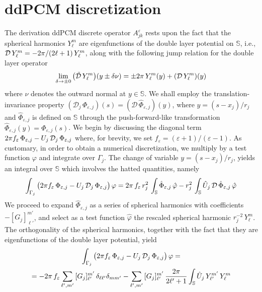 \section{ddPCM discretization\label{app:mats}}
The derivation ddPCM discrete operator $A^\varepsilon_{jk}$ rests upon the fact that the spherical harmonics $Y_\ell^m$ are eigenfunctions of the double layer potential on $\mathbb{S}$, i.e., $\mathcal{D} \, Y_\ell^m =  -2\pi/ (2\ell+1) \,  Y_\ell^m$, along with the following jump relation for the double layer operator
\begin{equation}\label{eq:jump}
	\lim_{\delta \to \pm 0} \big(\tilde{\mathcal{D}} \, Y_\ell^m\big)(y \pm \delta \nu) =  \pm 2\pi \, Y_\ell^m(y)+ ( \mathcal{D} \, Y_\ell^m )(y)
\end{equation}
where $\nu$ denotes the outward normal at $y \in \mathbb{S}$. We shall employ the translation-invariance property $(\mathcal{D}_j \, \Phi_{\varepsilon,j})(s) = (\mathcal{D} \, \hat{\Phi}_{\varepsilon,j})(y)$, where $y = (s - x_j)/r_j$ and $\hat{\Phi}_{\varepsilon,j}$ is defined on $\mathbb{S}$ through the push-forward-like transformation $\hat{\Phi}_{\varepsilon,j}(y) = \Phi_{\varepsilon,j}(s)$. We begin by discussing the diagonal term $2\pi f_\varepsilon \, \Phi_{\varepsilon,j} - U_j \, \mathcal{D}_j \, \Phi_{\varepsilon,j}$ where, for brevity, we set $f_\varepsilon = (\varepsilon + 1)/(\varepsilon - 1)$. As customary, in order to obtain a numerical discretization, we multiply by a test function $\varphi$ and integrate over $\Gamma_j$.  The change of variable $y = (s- x_j)/r_j$, yields an integral over $\mathbb{S}$ which involves the hatted quantities, namely
\[
\int_{\Gamma_j} \big(2\pi f_\varepsilon \, \Phi_{\varepsilon,j}  - U_j \, \mathcal{D}_j \, \Phi_{\varepsilon,j} \big) \, \varphi = 2 \pi  \, f_\varepsilon \, r_j^2 \,\int_\mathbb{S} \hat{\Phi}_{\varepsilon,j}  \, \hat{\varphi} - r_j^2 \, \int_\mathbb{S} \hat{U}_j \, \mathcal{D} \, \hat{\Phi}_{\varepsilon,j}  \, \hat{\varphi}
\]
We proceed to expand $\hat{\Phi}_{\varepsilon,j}$ as a series of spherical harmonics with coefficients $-[G_j]_{\ell'}^{m'}$, and select as a test function $\hat{\varphi}$  the rescaled spherical harmonic $r_j^{-2} \, Y_{\ell}^{m}$. The orthogonality of the spherical harmonics, together with the fact that they are eigenfunctions of the double layer potential, yield
\begin{multline*}
\int_{\Gamma_j} \big(2\pi f_\varepsilon \, \Phi_{\varepsilon,j}  - U_j \, \mathcal{D}_j \, \Phi_{\varepsilon,j} \big) \, \varphi = \\
= - 2 \pi  \, f_\varepsilon \sum_{\ell',m'}  \, [G_j]_{\ell'}^{m'} \, \delta_{\ell \ell'} \delta_{mm'}  -  \sum_{\ell',m'} \, [G_j]_{\ell'}^{m'} \, \frac{2\pi}{2\ell'+1} \int_{\mathbb{S}} \hat{U}_j \,  Y_{\ell'}^{m'}\, Y_\ell^m
\end{multline*}
